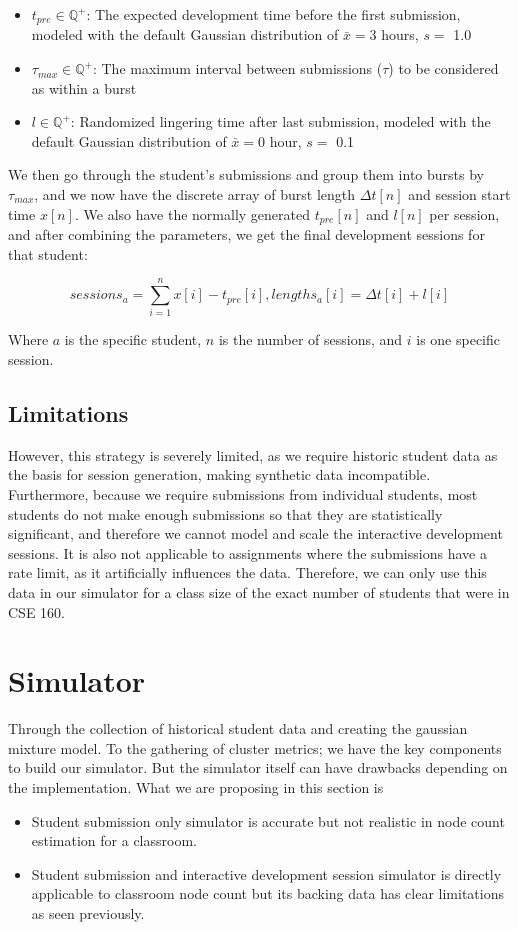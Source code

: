 \documentclass[acmlarge]{acmart}
\begin{document}
\begin{itemize}
  \item $t_{pre} \in \mathbb{Q}^+$: The expected development time before the first submission, modeled with the default Gaussian distribution of $\bar{x}= 3$ hours, $s =$ 1.0
  \item $\tau_{max} \in \mathbb{Q}^+$: The maximum interval between submissions ($\tau$) to be considered as within a burst
  \item $l \in \mathbb{Q}^+$: Randomized lingering time after last submission, modeled with the default Gaussian distribution of $\bar{x}= 0$ hour, $s =$ 0.1
\end{itemize}

We then go through the student's submissions and group them into bursts by $\tau_{max}$, and we now have the discrete array of burst length $\Delta t[n]$ and session start time $x[n]$. We also have the normally generated $t_{pre}[n]$ and $l[n]$ per session, and after combining the parameters, we get the final development sessions for that student:

$$sessions_{a} = \sum_{i=1}^{n} x[i]-t_{pre}[i], lengths_{a}[i] = \Delta t[i] + l[i]$$

Where $a$ is the specific student, $n$ is the number of sessions, and $i$ is one specific session.

\subsection{Limitations}

However, this strategy is severely limited, as we require historic student data as the basis for session generation, making synthetic data incompatible. Furthermore, because we require submissions from individual students, most students do not make enough submissions so that they are statistically significant, and therefore we cannot model and scale the interactive development sessions. It is also not applicable to assignments where the submissions have a rate limit, as it artificially influences the data. Therefore, we can only use this data in our simulator for a class size of the exact number of students that were in CSE 160.

\section{Simulator}
\label{sec:sim}
Through the collection of historical student data and creating the gaussian mixture model. To the gathering of cluster metrics; we have the key components to build our simulator. But the simulator itself can have drawbacks depending on the implementation. What we are proposing in this section is
\begin{itemize}
    \item Student submission only simulator is accurate but not realistic in node count estimation for a classroom. 
    \item Student submission and interactive development session simulator is directly applicable to classroom node count but its backing data has clear limitations as seen previously. 
\end{itemize} 
\end{document}
